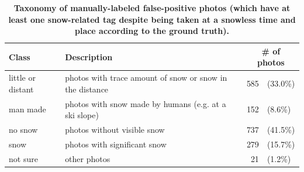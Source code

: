 \begin{table}[t]
 \caption {\textbf{Taxonomy of manually-labeled false-positive photos (which have at least one snow-related tag despite being taken at a snowless time and place according to the ground truth).}}
\label{tab:case_study_class} 
\begin{center}
\small{
\begin{tabular}{|l|p{4cm}|r@{\,\,}l|}
\hline 
\textbf{Class} & \textbf{Description} & \multicolumn{2}{c|}{\textbf{\# of photos}} \tabularnewline
\hline 
\hline 
little or distant   & photos with trace amount of snow or snow in the distance  & 585 & (33.0\%)\tabularnewline
\hline 
man made  & photos with snow made by humans (e.g. at a ski slope) & 152  & (8.6\%)\tabularnewline
\hline 
no snow & photos without visible snow  & 737 & (41.5\%)\tabularnewline
\hline 
snow & photos with significant snow  & 279 & (15.7\%)\tabularnewline
\hline 
not sure & other photos & 21 & (1.2\%)\tabularnewline
\hline 
\end{tabular}
}

\end{center}
\end{table}

